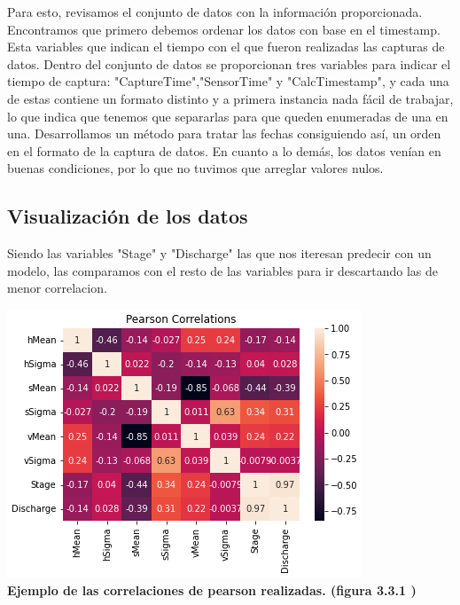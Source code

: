 \documentclass{article}
\begin{document}
        Para esto, revisamos el conjunto de datos con la información proporcionada. Encontramos que primero debemos ordenar los datos con base en el timestamp. Esta variables que indican el tiempo con el que fueron realizadas las capturas de datos. Dentro del conjunto de datos se proporcionan tres variables para indicar el tiempo de captura: "CaptureTime","SensorTime" y "CalcTimestamp", y cada una de estas contiene un formato distinto y a primera instancia nada fácil de trabajar, lo que indica que tenemos que separarlas para que queden enumeradas de una en una. Desarrollamos un método para tratar las fechas consiguiendo así, un orden en el formato de la captura de datos. En cuanto a lo demás, los datos venían en buenas condiciones, por lo que no tuvimos que arreglar valores nulos. \\

    \subsection{Visualización de los datos}

        Siendo las variables "Stage" y "Discharge" las que nos iteresan predecir con un modelo, las comparamos con el resto de las variables para ir descartando las de menor correlacion.

        \begin{center}
            \includegraphics{images/Corr_pearson4.PNG} \\
            
           \textbf{Ejemplo de las correlaciones de pearson realizadas. (figura 3.3.1 )} \\


       \end{center}   
\end{document}

